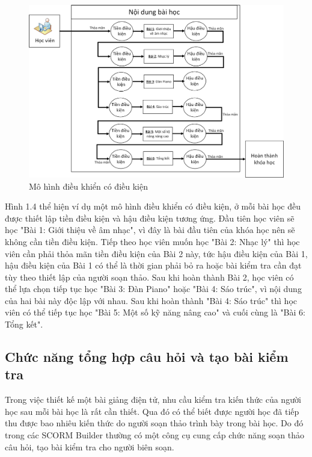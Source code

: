 		\begin{center}
		\begin{figure}[htp]
			\begin{center}
				\includegraphics[width=16cm]{Chapter1/Pictures/picture14.png}
			\end{center}
			\caption{Mô hình điều khiển có điều kiện}
			\label{refpicture13}
		\end{figure}
	\end{center}


	Hình 1.4 thể hiện ví dụ một mô hình điều khiển có điều kiện, ở mỗi bài học đều được thiết lập tiền điều kiện và hậu điều kiện tương ứng. Đầu tiên học viên sẽ học "Bài 1: Giới thiệu về âm nhạc", vì đây là bài đầu tiên của khóa học nên sẽ không cần tiền điều kiện. Tiếp theo học viên muốn học "Bài 2: Nhạc lý" thì học viên cần phải thỏa mãn tiền điều kiện của Bài 2 này, tức hậu điều kiện của Bài 1, hậu điều kiện của Bài 1 có thể là thời gian phải bỏ ra hoặc bài kiểm tra cần đạt tùy theo thiết lập của người soạn thảo. Sau khi hoàn thành Bài 2, học viên có thể lựa chọn tiếp tục học "Bài 3: Đàn Piano" hoặc "Bài 4: Sáo trúc", vì nội dung của hai bài này độc lập với nhau. Sau khi hoàn thành "Bài 4: Sáo trúc" thì học viên có thể tiếp tục học "Bài 5: Một số kỹ năng nâng cao" và cuối cùng là "Bài 6: Tổng kết".
	
	
	
	\newpage
	
\subsection{Chức năng tổng hợp câu hỏi và tạo bài kiểm tra}
	
	Trong việc thiết kế một bài giảng điện tử, nhu cầu kiểm tra kiến thức của người học sau mỗi bài học là rất cần thiết. Qua đó có thể biết được người học đã tiếp thu được bao nhiêu kiến thức do người soạn thảo trình bày trong bài học. Do đó trong các SCORM Builder thường có một công cụ cung cấp chức năng soạn thảo câu hỏi, tạo bài kiểm tra cho người biên soạn.\\


